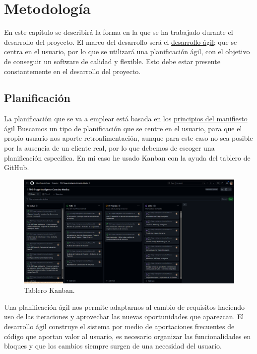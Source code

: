 \UseRawInputEncoding
\chapter{Metodología}
En este capítulo se describirá la forma en la que se ha trabajado durante el desarrollo del proyecto.
El marco del desarrollo será el {\href{https://www.redhat.com/es/topics/devops/what-is-agile-methodology}{desarrollo ágil}}; que se centra en el usuario, por lo que se utilizará una planificación ágil, con el objetivo
de conseguir un software de calidad y flexible. Esto debe estar presente constantemente en el desarrollo del proyecto.

\section{Planificación}
La planificación que se va a emplear está basada en los {\href{https://agilemanifesto.org/iso/es/principles.html}{principios del manifiesto ágil}}
Buscamos un tipo de planificación que se centre en el usuario, para que el propio usuario nos aporte retroalimentación, aunque para este caso no sea posible por la
ausencia de un cliente real, por lo que debemos de escoger una planificación específica. En mi caso he usado Kanban con la ayuda del tablero de GitHub.

\begin{figure}[h]
    \centering
    \includegraphics[width=0.9\linewidth]{logos/kanban.png}
    \caption{Tablero Kanban.}
    \label{fig:layout1}
\end{figure}

Una planificación ágil nos permite adaptarnos al cambio de requisitos haciendo uso de las iteraciones y aprovechar las nuevas oportunidades que aparezcan.
El desarrollo ágil construye el sistema por medio de aportaciones frecuentes de código que aportan valor
al usuario, es necesario organizar las funcionalidades en bloques y que los cambios siempre surgen de una necesidad del usuario.

